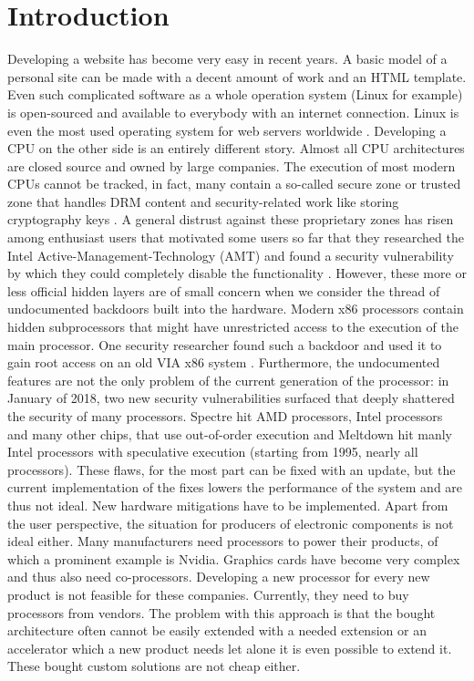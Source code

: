 
\chapter{Introduction}\label{chap:introduction}

Developing a website has become very easy in recent years. A basic model of a personal site can be made with
a decent amount of work and an HTML template. Even such complicated software as a whole operation system
(Linux for example) is open-sourced and available to everybody with an internet connection.
Linux is even the most used operating system for web servers worldwide \cite{w3techs_usage_op_website}.
Developing a CPU on the other side is an entirely different story. Almost all CPU architectures are
closed source and owned by large companies. The execution of most modern CPUs cannot be tracked, in
fact, many contain a so-called secure zone or trusted zone that handles DRM content and security-related
work like storing cryptography keys \cite{microcontrollertips_arm_trustzone_explained}.
A general distrust against these proprietary zones has risen among enthusiast users that motivated
some users so far that they researched the Intel Active-Management-Technology (AMT) and found a security
vulnerability by which they could completely disable the functionality \cite{github_disable_intel_amt}.
However, these more or less official hidden layers are of small concern when we consider the thread of
undocumented backdoors built into the hardware. Modern x86 processors contain hidden subprocessors
that might have unrestricted access to the execution of the main processor. One security researcher
found such a backdoor and used it to gain root access on an old VIA x86 system 
\cite{christopher_domas_god_mode_unlocked}.
Furthermore, the undocumented features are not the only problem of the current generation of the processor: in January
of 2018, two new security vulnerabilities surfaced that deeply shattered the security of many processors.
Spectre \cite{Kocher2018spectre} hit AMD processors, Intel processors and many other chips, that use 
out-of-order execution and Meltdown \cite{Lipp2018meltdown} hit manly Intel processors with speculative
execution (starting from 1995, nearly all processors). These flaws, for the 
most part can be fixed with an update,
but the current implementation of the fixes lowers the performance of the system and are thus not ideal.
New hardware mitigations have to be implemented.
Apart from the user perspective, the situation for producers of electronic components is not ideal either.
Many manufacturers need processors to power their products, of which a prominent example is Nvidia. Graphics cards
have become very complex and thus also need co-processors. Developing a new processor for every new product
is not feasible for these companies. Currently, they need to buy processors from vendors. The problem with this
approach is that the bought architecture often cannot be easily extended with a needed extension or
an accelerator which a new product needs let alone it is even possible to extend it. These bought
custom solutions are not cheap either.


